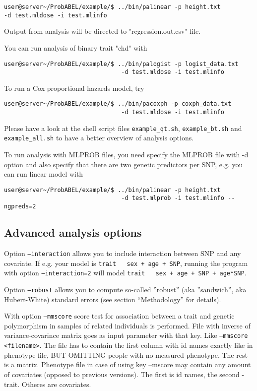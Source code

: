 \documentclass[12pt]{article}
\begin{document}
\begin{verbatim}
user@server~/ProbABEL/example/$ ../bin/palinear -p height.txt 
-d test.mldose -i test.mlinfo
\end{verbatim}

Output from analysis will be directed to "regression.out.csv" file.

You can run analysis of binary trait "chd" with 

\begin{verbatim}
user@server~/ProbABEL/example/$ ../bin/palogist -p logist_data.txt 
                                 -d test.mldose -i test.mlinfo
\end{verbatim}

To run a Cox proportional hazards model, try 

\begin{verbatim}
user@server~/ProbABEL/example/$ ../bin/pacoxph -p coxph_data.txt 
                                 -d test.mldose -i test.mlinfo
\end{verbatim}

Please have a look at the shell script files \texttt{example\_qt.sh}, 
\texttt{example\_bt.sh} and \texttt{example\_all.sh} to have 
a better overview of analysis options.

To run analysis with MLPROB files, you need specify the MLPROB file 
with -d option and also specify that there are two genetic predictors 
per SNP, e.g. you can run linear model with

\begin{verbatim}
user@server~/ProbABEL/example/$ ../bin/palinear -p height.txt 
                                 -d test.mlprob -i test.mlinfo --ngpreds=2
\end{verbatim}

\subsection{Advanced analysis options}

Option \texttt{--interaction} allows you to include interaction between SNP 
and any covariate. If e.g. your model is \texttt{trait ~ sex + age + SNP}, 
running the program with option \texttt{--interaction=2} will model 
\texttt{trait ~ sex + age + SNP + age*SNP}.

Option \texttt{--robust} allows you to compute so-called ''robust'' (aka
''sandwich'', aka Hubert-White) standard errors (see section ``Methodology''
for details).

With option \texttt{--mmscore} score test for association between a trait and genetic
polymorphism  in samples of related individuals is performed. File with inverse of variance-covarince matrix goes as input parameter
with that key. Like \texttt{--mmscore <filename>}. The file has to contain the first column with id names exactly like in phenotype file, BUT OMITTING people with no measured phenotype. The rest is a matrix.
Phenotype file in case of using key --mscore may contain any amount of covariates (opposed to previous versions). The first is id names, the second - trait. 
Otheres are covariates.
\end{document}
